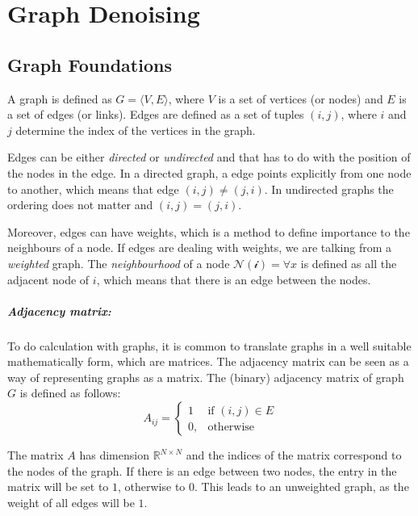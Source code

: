 \chapter{Graph Denoising}




\section{Graph Foundations}
A graph is defined as  $G = \langle V,E \rangle$, where $V$ is a set of 
vertices (or nodes) and $E$ is a set of edges (or links). 
Edges are defined as a set of tuples $(i, j)$, where $i$ and $j$ determine the 
index of the vertices in the graph.

Edges can be either \textit{directed} or \textit{undirected} and that has to do with the position of the 
nodes in the edge. In a directed graph, a edge points explicitly from
one node to another, which means that edge $(i, j) \neq (j, i)$. 
In undirected graphs the ordering does not matter and  $(i, j) = (j, i)$.

Moreover, edges can have weights, which is a method to define importance to the neighbours of a node.
If edges are dealing with weights, we are talking from a \textit{weighted} graph.
The \textit{neighbourhood} of a node $\mathcal{N(i)} = \forall x $ is defined as all the adjacent node 
of $i$, which means that there is an edge between the nodes. 


\paragraph{Adjacency matrix:}
To do calculation with graphs, it is common to translate graphs in a well suitable mathematically
form, which are matrices.
The adjacency matrix can be seen as a way of representing graphs as a matrix.
The (binary) adjacency matrix of graph $G$ is defined as follows:
\begin{equation}
    \label{eg:AdjacencyMatrix}
    A_{ij} =    
    \begin{cases}
        1  & \text{if } (i, j) \in E \\
        0, & \text{otherwise}
    \end{cases}
\end{equation}

The matrix $A$ has dimension $\mathbb{R}^{N \times N}$ and the indices of the matrix correspond to the nodes of the graph.
If there is an edge between two nodes, the entry in the matrix will be set to $1$, otherwise to $0$.
This leads to an unweighted graph, as the weight of all edges will be $1$. 

